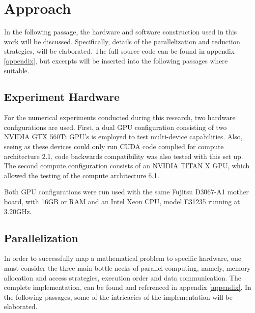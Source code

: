 \chapter{Approach}
\label{chapter:approach}

In the following passage, the hardware and software construction used
in this work will be discussed.  Specifically, details of the parallelization and
reduction strategies, will be elaborated.  The full source code can be found in
appendix \ref{appendix}, but excerpts will be inserted into the following passages
where suitable.

\section{Experiment Hardware}
For the numerical experiments conducted during this research, two hardware configurations
are used.  First, a dual GPU configuration consisting of two NVIDIA GTX 560Ti GPU's is
employed to test multi-device capabilities. Also, seeing as these devices
could only run \Gls{CUDA} code complied for compute architecture 2.1, code
backwards compatibility was also tested with this set up.
The second compute configuration consists of an NVIDIA TITAN X GPU, which allowed
the testing of the compute architecture 6.1.
\par
Both \Gls{GPU} configurations were run used with the same Fujitsu D3067-A1 mother board,
with 16GB or RAM and an Intel Xeon CPU, model E31235 running at 3.20GHz.

\section{Parallelization}
In order to successfully map a mathematical problem to specific hardware, one must
consider the three main bottle necks of parallel computing, namely,
memory allocation and access strategies, execution order and data communication.
The complete implementation, can be found and referenced in appendix \ref{appendix}.
In the following passages, some of the intricacies of the implementation will be
elaborated.

